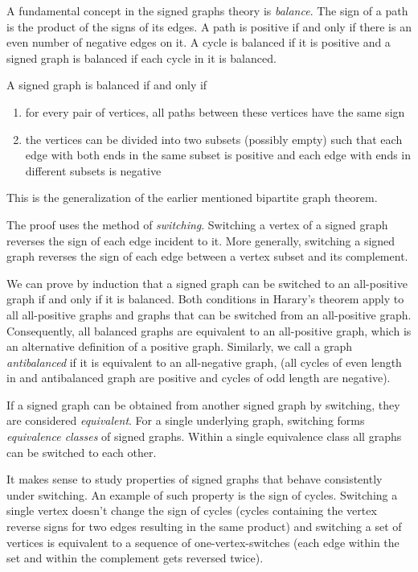 A fundamental concept in the signed graphs theory is \textit{balance}. The sign of a path is the product of the signs of its edges. A path is positive if and only if there is an even number of negative edges on it. A cycle is balanced if it is positive and a signed graph is balanced if each cycle in it is balanced\cite{harary}.

\begin{theorem}[Harary]\label{th:harary}
    A signed graph is balanced if and only if
    \begin{enumerate}
        \item for every pair of vertices, all paths between these vertices have the same sign
        \item the vertices can be divided into two subsets (possibly empty) such that each edge with both ends in the same subset is positive and each edge with ends in different subsets is negative
    \end{enumerate}

    This is the generalization of the earlier mentioned bipartite graph theorem.
\end{theorem}

The proof uses the method of \textit{switching}. Switching a vertex of a signed graph reverses the sign of each edge incident to it. More generally, switching a signed graph reverses the sign of each edge between a vertex subset and its complement.

We can prove by induction that a signed graph can be switched to an all-positive graph if and only if it is balanced. Both conditions in Harary's theorem apply to all all-positive graphs and graphs that can be switched from an all-positive graph. Consequently, all balanced graphs are equivalent to an all-positive graph, which is an alternative definition of a positive graph. Similarly, we call a graph \textit{antibalanced} if it is equivalent to an all-negative graph, (all cycles of even length in and antibalanced graph are positive and cycles of odd length are negative).

\begin{definition}
    If a signed graph can be obtained from another signed graph by switching, they are considered \textit{equivalent}. For a single underlying graph, switching forms \textit{equivalence classes} of signed graphs. Within a single equivalence class all graphs can be switched to each other.
\end{definition}

It makes sense to study properties of signed graphs that behave consistently under switching. An example of such property is the sign of cycles. Switching a single vertex doesn't change the sign of cycles (cycles containing the vertex reverse signs for two edges resulting in the same product) and switching a set of vertices is equivalent to a sequence of one-vertex-switches (each edge within the set and within the complement gets reversed twice).

